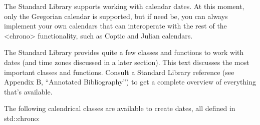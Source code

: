 
The Standard Library supports working with calendar dates. At this moment, only the Gregorian calendar is supported, but if need be, you can always implement your own calendars that can interoperate with the rest of the <chrono> functionality, such as Coptic and Julian calendars.

The Standard Library provides quite a few classes and functions to work with dates (and time zones discussed in a later section). This text discusses the most important classes and functions. Consult a Standard Library reference (see Appendix B, “Annotated Bibliography”) to get a complete overview of everything that’s available.


The following calendrical classes are available to create dates, all defined in std::chrono:

